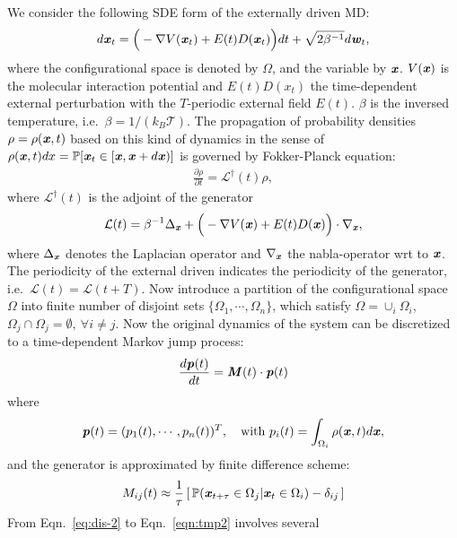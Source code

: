 \documentclass[aps, pre, preprint,unsortedaddress,a4paper,onecolumn]{revtex4}
\newcommand{\vect}[1]{\textbf{\textit{#1}}}
\newcommand{\ml}[0]{\mathcal {L}}
\newcommand{\mbp}[0]{\mathbb {P}}
\begin{document}
We consider  the following SDE form of the externally driven MD:
\begin{align}
  \label{eq:dis-1}
  d\vect x_t = \Big(-\nabla V(\vect x_t) + E(t) D(\vect x_t)\Big)dt + \sqrt{2\beta^{-1}} d\vect w_t, 
\end{align}
where the configurational space is denoted by $\Omega$, and the variable by
$\vect x$.   $V(\vect x)$ is the molecular interaction potential and
$E(t)D(x_t)$ the time-dependent external perturbation with the
$T$-periodic external field $E(t)$. $\beta$ is the inversed temperature,
i.e.~$\beta = 1/(k_B\mathcal T)$.
The propagation of probability
densities $\rho=\rho(\vect x,t)$ based on this kind of dynamics in the sense
of $\rho(\vect x,t)dx=\mathbb P[\vect x_t\in [\vect x,\vect x+d\vect x)]$ is governed by
Fokker-Planck equation:
\begin{align}
  \label{eq:dis-2}
  \frac{\partial \rho}{\partial t} = \ml^\dagger(t) \rho,
\end{align}
where $\ml^\dagger(t)$ is the adjoint of the generator
\begin{align}
  \label{eq:dis-3}
  \ml(t)=\beta^{-1}\Delta_{\vect x}+\Big(-\nabla V(\vect x) + E(t)D(\vect x)\Big)\cdot\nabla_{\vect x},
\end{align}
where $\Delta_{\vect x}$ denotes the Laplacian operator and $\nabla_{\vect x}$
the nabla-operator wrt to $\vect x$. 
The periodicity of the external driven indicates the periodicity of the generator,
i.e.~$\ml(t) = \ml(t+T)$.  Now
introduce a partition of the configurational space $\Omega$ into finite number of disjoint
sets $\{ \Omega_1, \cdots, \Omega_n\}$, which satisfy $\Omega = \cup_i \Omega_i$,
$\Omega_j\cap \Omega_j = \emptyset,\ \forall i\neq j$.
Now the original dynamics of the system can be discretized to a time-dependent
Markov jump process:
\begin{align}
  \label{eqn:tmp2}
  \frac{d\vect p(t)}{dt} = \vect M(t)\cdot \vect p(t)
\end{align}
where
\begin{align}
  \vect p(t) = (p_1(t), \cdots, p_n(t))^T, \quad \textrm{with}\ p_i(t) = \int_{\Omega_i} \rho(\vect x,t)d\vect x,
\end{align}
and the generator is approximated by finite difference scheme:
\begin{align}
  \label{eqn:tmp4}
  M_{ij}(t) \approx \frac{1}{\tau} \,[\, \mbp (\vect x_{t+\tau} \in \Omega_j \vert \vect x_{t} \in \Omega_i) - \delta_{ij} \,]
\end{align}
From Eqn.~\eqref{eq:dis-2} to Eqn.~\eqref{eqn:tmp2} involves several
\end{document}
